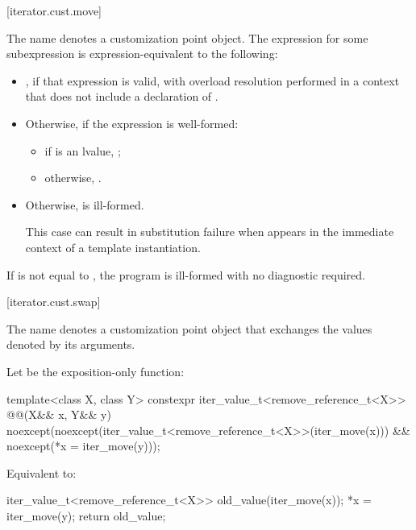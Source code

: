 [iterator.cust.move]{}

%
\pnum
The name  denotes
a customization point object.
The expression  for some subexpression  is
expression-equivalent to the following:

\begin{itemize}
\item {}, if that expression is valid, with overload
resolution performed in a context that does not include a declaration of
.

\item Otherwise, if the expression  is well-formed:
\begin{itemize}
\item if  is an lvalue, ;

\item otherwise, .
\end{itemize}

\item Otherwise,  is ill-formed.
\begin{note}
This case can result in substitution failure when 
appears in the immediate context of a template instantiation.
\end{note}
\end{itemize}

\pnum
If  is not equal to , the program is
ill-formed with no diagnostic required.

[iterator.cust.swap]{}

%
\pnum
The name  denotes
a customization point object
that exchanges the values denoted by its
arguments.

\pnum
Let  be the exposition-only function:
\begin{itemdecl}
template<class X, class Y>
  constexpr iter_value_t<remove_reference_t<X>> @@(X&& x, Y&& y)
    noexcept(noexcept(iter_value_t<remove_reference_t<X>>(iter_move(x))) &&
      noexcept(*x = iter_move(y)));
\end{itemdecl}

\begin{itemdescr}
\pnum
\effects Equivalent to:
\begin{codeblock}
iter_value_t<remove_reference_t<X>> old_value(iter_move(x));
*x = iter_move(y);
return old_value;
\end{codeblock}
\end{itemdescr}

